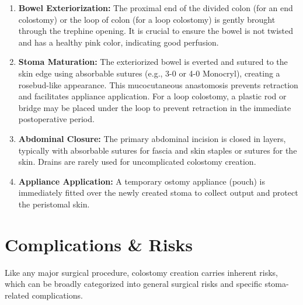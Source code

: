 \begin{enumerate}
  \item \textbf{Bowel Exteriorization:} The proximal end of the divided colon (for an end colostomy) or the loop of colon (for a loop colostomy) is gently brought through the trephine opening. It is crucial to ensure the bowel is not twisted and has a healthy pink color, indicating good perfusion.
  
  \item \textbf{Stoma Maturation:} The exteriorized bowel is everted and sutured to the skin edge using absorbable sutures (e.g., 3-0 or 4-0 Monocryl), creating a rosebud-like appearance. This mucocutaneous anastomosis prevents retraction and facilitates appliance application. For a loop colostomy, a plastic rod or bridge may be placed under the loop to prevent retraction in the immediate postoperative period.
  
  \item \textbf{Abdominal Closure:} The primary abdominal incision is closed in layers, typically with absorbable sutures for fascia and skin staples or sutures for the skin. Drains are rarely used for uncomplicated colostomy creation.
  
  \item \textbf{Appliance Application:} A temporary ostomy appliance (pouch) is immediately fitted over the newly created stoma to collect output and protect the peristomal skin.
\end{enumerate}

\section*{Complications \& Risks}
Like any major surgical procedure, colostomy creation carries inherent risks, which can be broadly categorized into general surgical risks and specific stoma-related complications.

